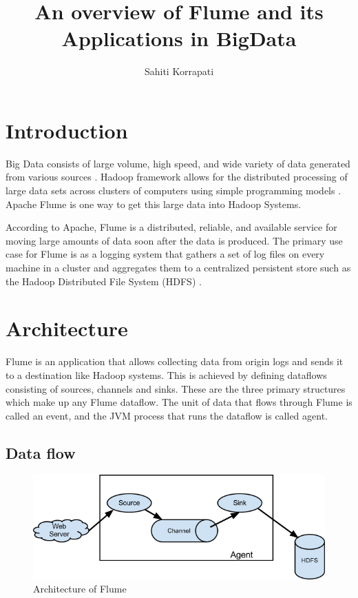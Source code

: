 \documentclass[9pt,twocolumn,twoside]{styles/osajnl}
\title{An overview of Flume and its Applications in BigData }
\author[1,*]{Sahiti Korrapati}
\affil[1]{School of Informatics and Computing, Bloomington, IN 47408, U.S.A.}
\affil[*]{Corresponding authors: sakorrap@iu.edu, S17-IR-2013}
\begin{document}
\maketitle

\section{Introduction}

Big Data consists of large volume, high speed, and wide variety of data generated from various sources \cite{tutorialspoint}. Hadoop framework allows for the distributed processing of large data sets across clusters of computers using simple programming models \cite{hadoop}. Apache Flume is one way to get this large data into Hadoop Systems.

According to Apache, Flume is a distributed, reliable, and available service for moving large amounts of data soon after the data is produced. The primary use case for Flume is as a logging system that gathers a set of log files on every machine in a cluster and aggregates them to a centralized persistent store such as the Hadoop Distributed File System (HDFS) \cite{user-manual}.

\section{Architecture}

Flume is an application that allows collecting data from origin logs and sends it to a destination like Hadoop systems. This is achieved by defining dataflows consisting of sources, channels and sinks. These are the three primary structures which make up any Flume dataflow. The  unit of data that flows through Flume is called an event, and the JVM process that runs the dataflow is called agent. 

\subsection{Data flow}

\begin{figure}[htbp]
\centering
\includegraphics[width=\linewidth]{images/FlumeArchitecture.png}
\caption{Architecture of Flume \cite{user-manual}}
\label{fig:FA}
\end{figure}
\end{document}

